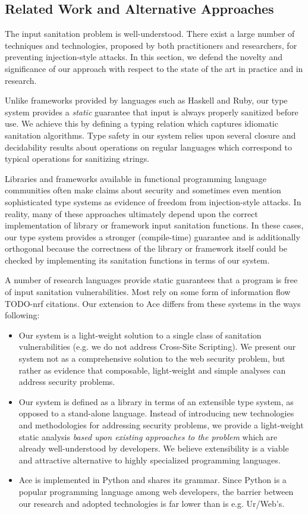 \documentclass{acm_proc_article-sp}
\theoremstyle{definition}
\begin{document}
\subsection{Related Work and Alternative Approaches}

The input sanitation problem is well-understood. There exist a large number
of techniques and technologies, proposed by both practitioners and researchers, for
preventing injection-style attacks. In this section, we defend the novelty and
significance of our approach with respect to the state of the art in practice 
and in research.

Unlike frameworks provided by languages such as Haskell and
Ruby, our type system provides a \emph{static} guarantee that input is always 
properly sanitized before use. We achieve this by defining a typing relation
which captures idiomatic sanitation algorithms. Type safety in our system relies upon 
several closure and decidability results about operations on 
regular languages which correspond to typical operations for sanitizing strings. 

Libraries and frameworks available in functional programming language communities often
make claims about security and sometimes even mention sophisticated
type systems as evidence of freedom from injection-style attacks.
In reality, many of these approaches ultimately depend upon the correct implementation
of library or framework input sanitation functions. In these cases, our type system
provides a stronger (compile-time) guarantee and is additionally orthogonal because
the correctness of the library or framework itself could be checked by implementing its
sanitation functions in terms of our system.

A number of research languages provide static guarantees that a program
is free of input sanitation vulnerabilities. Most rely on some form of information
flow TODO-nrf citations. Our extension to Ace differs from
these systems in the ways following:
\begin{itemize}
  \item Our system is a light-weight solution to a single class of sanitation
  vulnerabilities (e.g. we do not address Cross-Site Scripting). We present our
  system not as a comprehensive solution to the web security problem, but rather as
  evidence that composable, light-weight and simple analyses can address security
  problems.
  \item Our system is defined as a library in terms of an extensible type system,
  as opposed to a stand-alone language. Instead of introducing new technologies
  and methodologies for addressing security problems, we provide a light-weight
  static analysis \emph{based upon existing approaches to the problem} which are
  already well-understood by developers. We believe extensibility is a viable
  and attractive alternative to highly specialized programming languages.
  \item Ace is implemented in Python and shares its grammar. Since Python is a 
  popular programming language among web developers, the barrier between our research
  and adopted technologies is far lower than is e.g. Ur/Web's.
\end{itemize}
\end{document}
